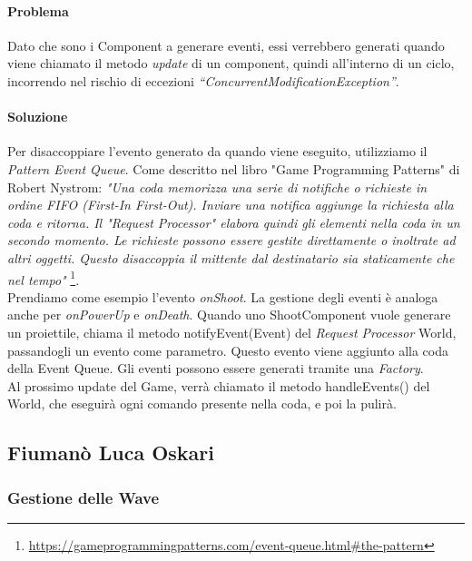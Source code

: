 \documentclass[a4paper,12pt]{report}
\begin{document}
\paragraph{Problema} Dato che sono i Component a generare eventi, essi verrebbero generati quando viene chiamato il metodo \textit{update} di un component, quindi all’interno di un ciclo, incorrendo nel rischio di eccezioni \textit{“ConcurrentModificationException”}.

\paragraph{Soluzione} Per disaccoppiare l'evento generato da quando viene eseguito, utilizziamo il \textit{Pattern Event Queue}. 
Come descritto nel libro "Game Programming Patterns" di Robert Nystrom: \textit{"Una coda memorizza una serie di notifiche o richieste in ordine FIFO (First-In First-Out). 
Inviare una notifica aggiunge la richiesta alla coda e ritorna. Il "Request Processor" elabora quindi gli elementi nella coda in un secondo momento. 
Le richieste possono essere gestite direttamente o inoltrate ad altri oggetti. Questo disaccoppia il mittente dal destinatario sia staticamente che nel tempo"}
\footnote{\url{https://gameprogrammingpatterns.com/event-queue.html#the-pattern}}.
\\
Prendiamo come esempio l'evento \textit{onShoot}. La gestione degli eventi è analoga anche per \textit{onPowerUp} e \textit{onDeath}. Quando uno ShootComponent vuole generare un proiettile, chiama il metodo notifyEvent(Event) del \textit{Request Processor} World, 
passandogli un evento come parametro. Questo evento viene aggiunto alla coda della Event Queue. Gli eventi possono essere generati tramite una \textit{Factory}.
\\
Al prossimo update del Game, verrà chiamato il metodo handleEvents() del World, che eseguirà ogni comando presente nella coda, e poi la pulirà.
\subsection*{Fiumanò Luca Oskari}

\subsubsection{Gestione delle Wave}
\end{document}
